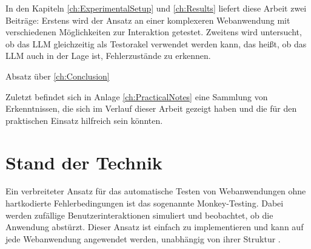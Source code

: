 In den Kapiteln \ref{ch:ExperimentalSetup} und \ref{ch:Results} liefert diese Arbeit zwei Beiträge:
Erstens wird der Ansatz an einer komplexeren Webanwendung mit verschiedenen Möglichkeiten zur Interaktion getestet.
Zweitens wird untersucht, ob das LLM gleichzeitig als Testorakel verwendet werden kann, das heißt, ob das LLM auch in der Lage ist, Fehlerzustände zu erkennen.

Absatz über \ref{ch:Conclusion}

Zuletzt befindet sich in Anlage \ref{ch:PracticalNotes} eine Sammlung von Erkenntnissen, die sich im Verlauf dieser Arbeit gezeigt haben und die für den praktischen Einsatz hilfreich sein könnten.




\chapter{Stand der Technik}
\label{ch:RelatedWork}

Ein verbreiteter Ansatz für das automatische Testen von Webanwendungen ohne hartkodierte Fehlerbedingungen ist das sogenannte Monkey-Testing.
Dabei werden zufällige Benutzerinteraktionen simuliert und beobachtet, ob die Anwendung abstürzt.
Dieser Ansatz ist einfach zu implementieren und kann auf jede Webanwendung angewendet werden, unabhängig von ihrer Struktur \cite{monkey_testing}.

